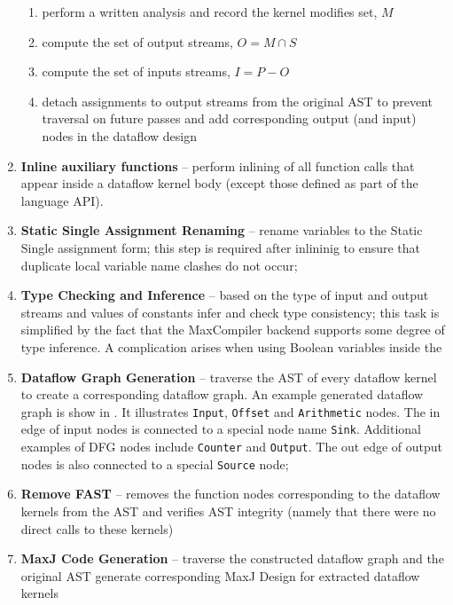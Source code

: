 \begin{enumerate}
\begin{enumerate}
\item perform a written analysis and record the kernel modifies set, $M$
\item compute the set of output streams, $O = M \cap S$
\item compute the set of inputs streams, $I = P - O$
\item detach assignments to output streams from the original AST to
  prevent traversal on future passes and add corresponding output (and
  input) nodes in the dataflow design
\end{enumerate}
\item \textbf{Inline auxiliary functions} -- perform inlining of all
  function calls that appear inside a \FAST{} dataflow kernel body
  (except those defined as part of the language API).
\item \textbf{Static Single Assignment Renaming} -- rename variables
  to the Static Single assignment form; this step is required after
  inlininig to ensure that duplicate local variable name clashes do not occur;
\item \textbf{Type Checking and Inference} -- based on the type of
  input and output streams and values of constants infer and check
  type consistency; this task is simplified by the fact that the
  MaxCompiler backend supports some degree of type inference.  A
  complication arises when using Boolean variables inside the
\item \textbf{Dataflow Graph Generation} -- traverse the AST of every
  dataflow kernel to create a corresponding dataflow graph. An example
  generated dataflow graph is show in . It
  illustrates \texttt{Input}, \texttt{Offset} and \texttt{Arithmetic}
  nodes. The in edge of input nodes is connected to a special node
  name \texttt{Sink}. Additional examples of \fastc{} DFG nodes
  include \texttt{Counter} and \texttt{Output}. The out edge of output
  nodes is also connected to a special \texttt{Source} node;
\item \textbf{Remove FAST} -- removes the function nodes corresponding
  to the dataflow kernels from the AST and verifies AST integrity
  (namely that there were no direct calls to these kernels)
\item \textbf{MaxJ Code Generation} -- traverse the constructed
  dataflow graph and the original AST generate corresponding MaxJ
  Design for extracted dataflow kernels

\end{enumerate}

